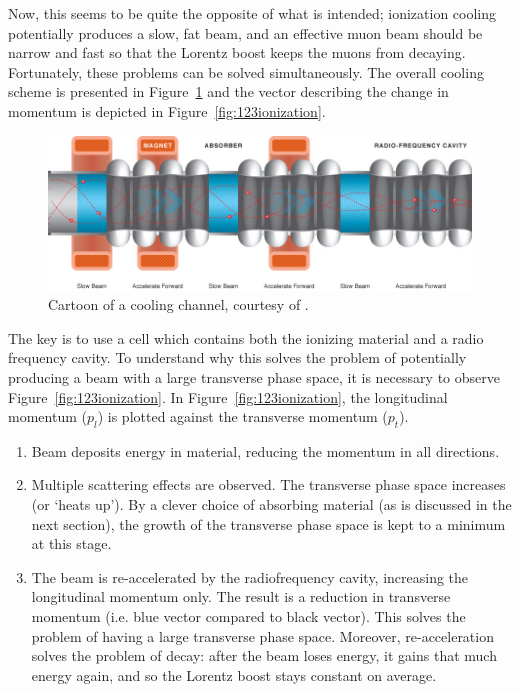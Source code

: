 Now, this seems to be quite the opposite of what is intended; ionization cooling potentially produces a slow, fat beam, and an effective muon beam should be narrow and fast so that the Lorentz boost keeps the muons from decaying. Fortunately, these problems can be solved simultaneously. The overall cooling scheme is presented in  Figure~\ref{fig:coolingchannel} and the vector describing the change in momentum is depicted in Figure~\ref{fig:123ionization}.
\begin{figure}
  \begin{center} 
    \includegraphics[width=\textwidth]{Figures/coolingchannel} 
  \caption[Cartoon of a cooling channel.]{Cartoon of a cooling channel, courtesy of \cite{map}.}
  \label{fig:coolingchannel}
 \end{center}
\end{figure}

The key is to use a cell which contains both the ionizing material and a radio frequency cavity. To understand why this solves the problem of potentially producing a beam with a large transverse phase space, it is necessary to observe Figure~\ref{fig:123ionization}. In Figure~\ref{fig:123ionization}, the longitudinal momentum ($p_l$) is plotted against the transverse momentum ($p_t$). 
   \begin{enumerate} 
  \item{Beam deposits energy in material, reducing the momentum in all directions.}
  \item{Multiple scattering effects are observed. The transverse phase space increases (or `heats up'). By a clever choice of absorbing material (as is discussed in the next section), the growth of the transverse phase space is kept to a minimum at this stage.}
  \item{The beam is re-accelerated by the radiofrequency cavity, increasing the longitudinal momentum only. The result is a reduction in transverse momentum (i.e. blue vector compared to black vector). This solves the problem of having a large transverse phase space. Moreover, re-acceleration solves the problem of decay: after the beam loses energy, it gains that much energy again, and so the Lorentz boost stays constant on average.}
\end{enumerate}

